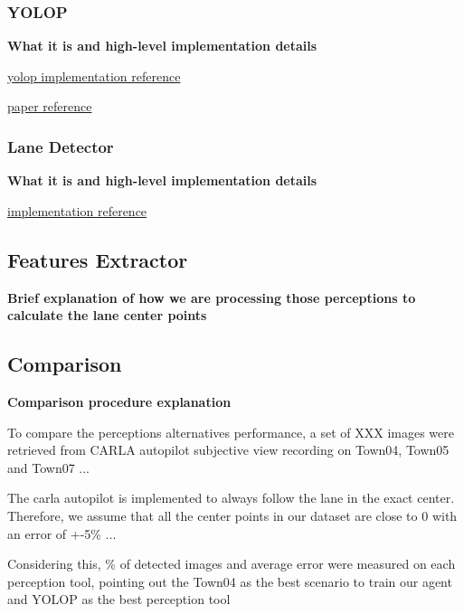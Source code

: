 \documentclass[conference]{IEEEtran}
\begin{document}
\subsubsection{YOLOP}
\textbf{What it is and high-level implementation details}

\href{https://pytorch.org/hub/hustvl_yolop/}{yolop implementation reference}

\href{https://arxiv.org/abs/2108.11250}{paper reference}

\subsubsection{Lane Detector}
\textbf{What it is and high-level implementation details}

\href{https://github.com/RoboticsLabURJC/carla_lane_detector/blob/main/examples/lane_detection_inference.py }{implementation reference}

\subsection{Features Extractor}
\textbf{Brief explanation of how we are processing those perceptions to calculate the lane center points}

\subsection{Comparison}
\textbf{Comparison procedure explanation}

To compare the perceptions alternatives performance, a set of XXX images were retrieved from CARLA autopilot subjective view recording on Town04, Town05 and Town07 ...

The carla autopilot is implemented to always follow the lane in the exact center. Therefore, we assume that all the center points in our dataset are close to 0 with an error of +-5\%  ...

Considering this, \% of detected images and average error were measured on each perception tool, pointing out the Town04 as the best scenario to train our agent and YOLOP as the best perception tool
\end{document}
